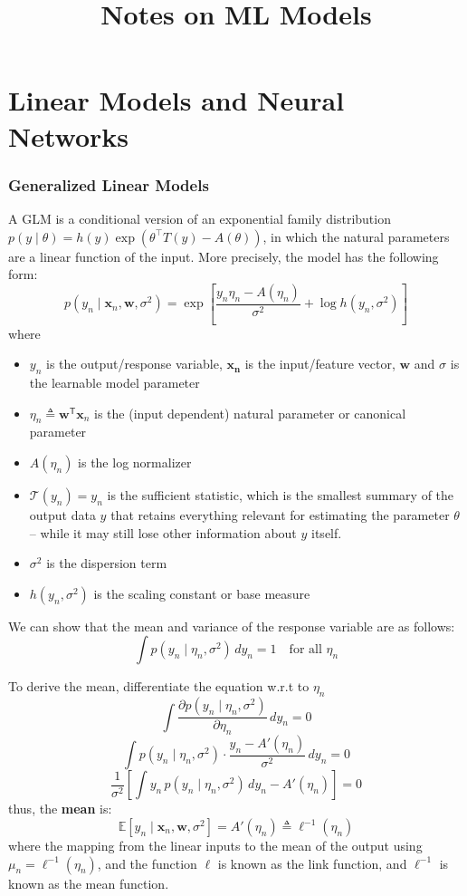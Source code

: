 \documentclass[11pt]{article}
\begin{document}
\title{Notes on ML Models}
\author{}
\date{}
\maketitle

\clearpage
\part{Linear Models and Neural Networks}
\section{Generalized Linear Models}

A GLM is a conditional version of an exponential family distribution $p(y \mid \theta) = h(y) \exp\left(\theta^\top T(y) - A(\theta)\right)$, in which the natural parameters are a linear function of the input. More precisely, the model has the following form:
\[
p(y_n \mid \mathbf{x}_n, \mathbf{w}, \sigma^2)
= \exp\left[\frac{y_n\eta_n - A(\eta_n)}{\sigma^2} + \log h(y_n, \sigma^2)\right]
\]
where 
\begin{itemize}
    \item $y_n$ is the output/response variable, $\mathbf{x_n}$ is the input/feature vector, $\mathbf{w}$ and $\sigma$ is the learnable model parameter 
    \item $\eta_n \triangleq \mathbf{w}^{\mathsf{T}}\mathbf{x}_n$ is the (input dependent) natural parameter or canonical parameter
    \item $A(\eta_n)$ is the log normalizer
    \item $\mathcal{T}(y_n) = y_n$ is the sufficient statistic, which is the smallest summary of the output data $y$ that retains everything relevant for estimating the parameter $\theta$ -- while it may still lose other information about $y$ itself.
    \item $\sigma^2$ is the dispersion term
    \item $h(y_n, \sigma^2)$  is the scaling constant or base measure
\end{itemize}

We can show that the mean and variance of the response variable are as follows:
\[
\int p(y_n \mid \eta_n, \sigma^2)\, dy_n = 1 \quad \text{for all } \eta_n
\]

To derive the mean, differentiate the equation w.r.t to $\eta_n$
\[ \int \frac{\partial p(y_n \mid \eta_n, \sigma^2)}{\partial \eta_n}\, dy_n = 0 \]
\[\int p(y_n\mid\eta_n,\sigma^2) \cdot \frac{y_n - A'(\eta_n)}{\sigma^2}\, dy_n = 0\]
\[\frac{1}{\sigma^2}\left[\int y_n\, p(y_n\mid\eta_n,\sigma^2)\, dy_n - A'(\eta_n)\right] = 0\]
thus, the \textbf{mean} is:
\[
\mathbb{E}\left[y_n \mid \mathbf{x}_n, \mathbf{w}, \sigma^2\right]
= A'(\eta_n) \triangleq \ell^{-1}(\eta_n)
\]
where the mapping from the linear inputs to the mean of the output using $\mu_n = \ell^{-1}(\eta_n)$, and the function $\ell$ is known as the link function, and $\ell^{-1}$ is known as the mean function. 
\end{document}

